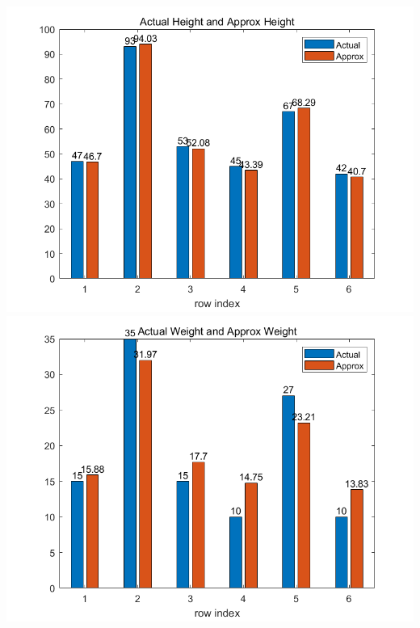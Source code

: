 \documentclass{article}
\begin{document}
\begin{center}
    \includegraphics[scale = 0.6]{height.png}
    \includegraphics[scale = 0.6]{weight.png}
    
\end{center}

   

    
\end{document}
